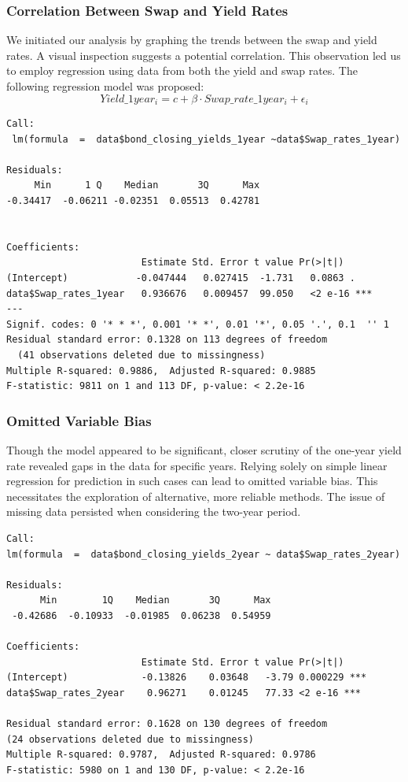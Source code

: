 \documentclass[10pt]{article}
\begin{document}
\subsubsection{Correlation Between Swap and Yield Rates}

We initiated our analysis by graphing the trends between the swap and yield rates. A visual inspection suggests a potential correlation. This observation led us to employ regression using data from both the yield and swap rates. The following regression model was proposed:
\[Yield\_1year_{i}=c+\beta \cdot Swap\_rate\_1year_{i}+\epsilon_{i}\]

\begin{lstlisting}
Call:
 lm(formula  =  data$bond_closing_yields_1year ~data$Swap_rates_1year)

Residuals:
     Min      1 Q    Median       3Q      Max  
-0.34417  -0.06211 -0.02351  0.05513  0.42781


Coefficients:
                        Estimate Std. Error t value Pr(>|t|)
(Intercept)            -0.047444   0.027415  -1.731   0.0863 .
data$Swap_rates_1year   0.936676   0.009457  99.050   <2 e-16 *** 
---
Signif. codes: 0 '* * *', 0.001 '* *', 0.01 '*', 0.05 '.', 0.1  '' 1
Residual standard error: 0.1328 on 113 degrees of freedom 
  (41 observations deleted due to missingness)
Multiple R-squared: 0.9886,  Adjusted R-squared: 0.9885
F-statistic: 9811 on 1 and 113 DF, p-value: < 2.2e-16    
\end{lstlisting}

\subsubsection{Omitted Variable Bias}
Though the model appeared to be significant, closer scrutiny of the one-year yield rate revealed gaps in the data for specific years. Relying solely on simple linear regression for prediction in such cases can lead to omitted variable bias. This necessitates the exploration of alternative, more reliable methods. The issue of missing data persisted when considering the two-year period.


\begin{lstlisting}
Call:
lm(formula  =  data$bond_closing_yields_2year ~ data$Swap_rates_2year)

Residuals:
      Min        1Q    Median       3Q      Max  
 -0.42686  -0.10933  -0.01985  0.06238  0.54959
 
Coefficients:
                        Estimate Std. Error t value Pr(>|t|)
(Intercept)             -0.13826    0.03648   -3.79 0.000229 *** 
data$Swap_rates_2year    0.96271    0.01245   77.33 <2 e-16 *** 

Residual standard error: 0.1628 on 130 degrees of freedom
(24 observations deleted due to missingness)
Multiple R-squared: 0.9787,  Adjusted R-squared: 0.9786
F-statistic: 5980 on 1 and 130 DF, p-value: < 2.2e-16    
\end{lstlisting}
\end{document}

